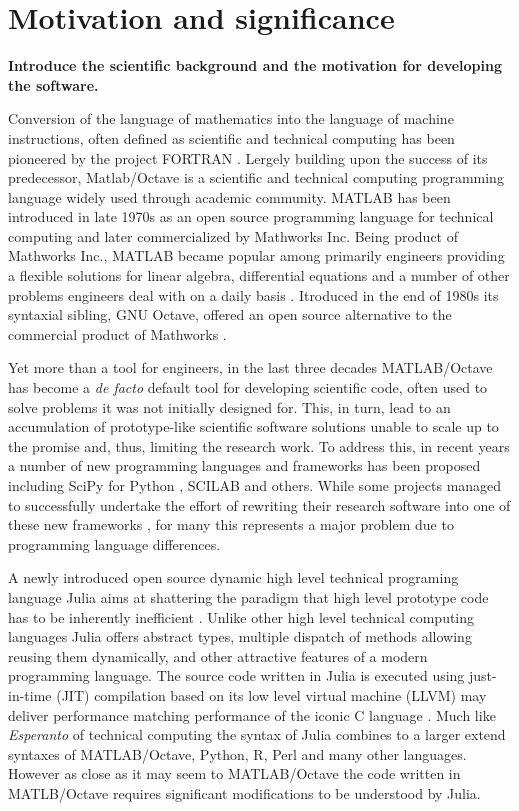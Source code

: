 \section{Motivation and significance}
\label{} 

\textbf{Introduce the scientific background and the motivation for developing the software.}

Conversion of the language of mathematics into the language of machine instructions, often defined as scientific and technical computing has been pioneered by the project FORTRAN \cite{Backus:1957:FAC}. Lergely building upon the success of its predecessor, Matlab/Octave is a scientific and technical computing programming language widely used through academic community. MATLAB has been introduced in late 1970s as an open source programming language for technical computing and later commercialized by Mathworks Inc. Being product of Mathworks Inc., MATLAB became popular among primarily engineers providing a flexible solutions for linear algebra, differential equations and a number of other problems engineers deal with on a daily basis \cite{moore2014matlab}. Itroduced in the end of 1980s its syntaxial sibling, GNU Octave, offered an open source alternative to the commercial product of Mathworks \cite{eaton1997gnu}.

Yet more than a tool for engineers, in the last three decades MATLAB/Octave has become a \textit{de facto} default tool for developing scientific code, often used to solve problems it was not initially designed for. This, in turn, lead to an accumulation of prototype-like scientific software solutions unable to scale up to the promise and, thus, limiting the research work. To address this, in recent years a number of new programming languages and frameworks has been proposed including SciPy for Python \cite{jones2001open, Olivier_2002}, SCILAB \cite{Campbell_2009} and others. While some projects managed to successfully undertake the effort of rewriting their research software into one of these new frameworks \cite{17076895, 21349861}, for many this represents a major problem due to programming language differences.

A newly introduced open source dynamic high level technical programing language Julia aims at shattering the paradigm that high level prototype code has to be inherently inefficient \cite{bezanson2012julia, bezanson2014julia}.  Unlike other high level technical computing languages Julia offers abstract types, multiple dispatch of methods allowing reusing them dynamically, and other attractive features of a modern programming language. The source code written in Julia is executed using just-in-time (JIT) compilation based on its low level virtual machine (LLVM) may deliver performance matching performance of the iconic C language \cite{bezanson2012julia, bezanson2014julia}. Much like \textit{Esperanto} of technical computing the syntax of Julia combines to a larger extend syntaxes of MATLAB/Octave, Python, R, Perl and many other languages. However as close as it may seem to MATLAB/Octave the code written in MATLB/Octave requires significant modifications to be understood by Julia.

